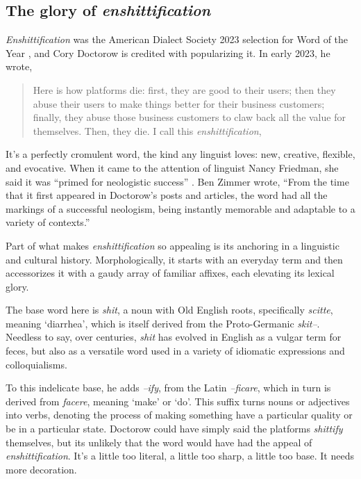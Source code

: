 \subsection{The glory of \textit{enshittification}}

\textit{Enshittification} was the American Dialect Society 2023 selection for Word of the Year \citep{Roberts2024}, and Cory Doctorow is credited with popularizing it. In early 2023, he wrote,


\begin{quote}
    Here is how platforms die: first, they are good to their users; then they abuse their users to make things better for their business customers; finally, they abuse those business customers to claw back all the value for themselves. Then, they die. I call this \textit{enshittification},\hfill\citep{doctorow2023}
\end{quote}

It's a perfectly cromulent word, the kind any linguist loves: new, creative, flexible, and evocative. When it came to the attention of linguist Nancy Friedman, she said it was ``primed for neologistic success'' \citep{friedman2024sweary}. Ben Zimmer wrote, ``From the time that it first appeared in Doctorow's posts and articles, the word had all the markings of a successful neologism, being instantly memorable and adaptable to a variety of contexts.''

Part of what makes \textit{enshittification} so appealing is its anchoring in a linguistic and cultural history. Morphologically, it starts with an everyday term and then accessorizes it with a gaudy array of familiar affixes, each elevating its lexical glory.

The base word here is \textit{shit}, a noun with Old English roots, specifically \textit{scitte}, meaning `diarrhea', which is itself derived from the Proto-Germanic \textit{skit--}. Needless to say, over centuries, \textit{shit} has evolved in English as a vulgar term for feces, but also as a versatile word used in a variety of idiomatic expressions and colloquialisms.

To this indelicate base, he adds \textit{--ify}, from the Latin \textit{--ficare}, which in turn is derived from \textit{facere}, meaning `make' or `do'. This suffix turns nouns or adjectives into verbs, denoting the process of making something have a particular quality or be in a particular state. Doctorow could have simply said the platforms \textit{shittify} themselves, but its unlikely that the word would have had the appeal of \textit{enshittification}. It's a little too literal, a little too sharp, a little too base. It needs more decoration.

